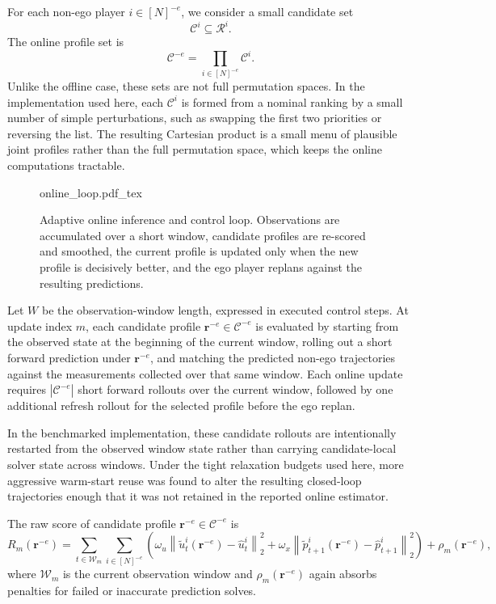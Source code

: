 For each non-ego player $i \in [N]^{-e}$, we consider a small candidate set
\[
\mathcal{C}^i \subseteq \mathcal R^i.
\]
The online profile set is
\[
\mathcal{C}^{-e} = \prod_{i \in [N]^{-e}} \mathcal{C}^i.
\]
Unlike the offline case, these sets are not full permutation spaces.
In the implementation used here, each $\mathcal{C}^i$ is formed from a nominal ranking by a small
number of simple perturbations, such as swapping the first two priorities or reversing the list.
The resulting Cartesian product is a small menu of plausible joint profiles rather than the full
permutation space, which keeps the online computations tractable.


\begin{figure}[t]
    \centering
    \def\svgwidth{0.98\textwidth}
    {online_loop.pdf_tex}
    \caption{Adaptive online inference and control loop. Observations are accumulated over a short
    window, candidate profiles are re-scored and smoothed, the current profile is updated only when the new
    profile is decisively better, and the ego player replans against the resulting predictions.}
    \label{fig:inverse_online_loop}
\end{figure}

Let $W$ be the observation-window length, expressed in executed control steps.
At update index $m$, each candidate profile $\boldsymbol{r}^{-e} \in \mathcal{C}^{-e}$ is evaluated by
starting from the observed state at the beginning of the current window, rolling out a short
forward prediction under $\boldsymbol{r}^{-e}$, and matching the predicted non-ego trajectories
against the measurements collected over that same window.
Each online update requires $|\mathcal{C}^{-e}|$ short forward rollouts over the current
window, followed by one additional refresh rollout for the selected profile before the ego replan.

In the benchmarked implementation, these candidate rollouts are intentionally restarted from the
observed window state rather than carrying candidate-local solver state across windows.
Under the tight relaxation budgets used here, more aggressive warm-start reuse was found to alter
the resulting closed-loop trajectories enough that it was not retained in the reported online
estimator.

The raw score of candidate profile
$\boldsymbol{r}^{-e} \in \mathcal{C}^{-e}$ is
\begin{equation}
R_m(\boldsymbol{r}^{-e})
=
\sum_{t \in \mathcal{W}_m}
\sum_{i \in [N]^{-e}}
\left(
\omega_u \left\lVert \tilde{u}^i_t(\boldsymbol{r}^{-e}) - \hat{u}^i_t \right\rVert_2^2
+
\omega_x \left\lVert \tilde{p}^i_{t+1}(\boldsymbol{r}^{-e}) - \hat{p}^i_{t+1} \right\rVert_2^2
\right)
+
\rho_m(\boldsymbol{r}^{-e}),
\label{eq:inverse_online_raw}
\end{equation}
where $\mathcal{W}_m$ is the current observation window and $\rho_m(\boldsymbol{r}^{-e})$ again absorbs
penalties for failed or inaccurate prediction solves.

